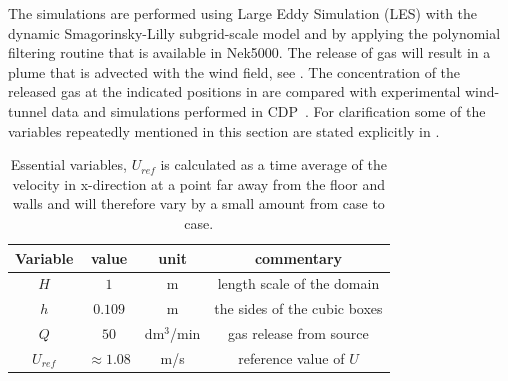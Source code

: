 The simulations are performed using Large Eddy Simulation (LES) 
with the dynamic Smagorinsky-Lilly subgrid-scale model and by applying the polynomial filtering
routine that is available in Nek5000. 
The release of gas will result in a plume that is advected with the wind field,
see . The concentration of the released gas at the 
indicated positions in  are compared with 
experimental wind-tunnel data and simulations performed in CDP~\cite{CDP}. 
For clarification some of the variables repeatedly mentioned in this section are
stated explicitly in .
\begin{table}[h]
    \centering
    \begin{tabular}{c c c c}
        Variable & value & unit & commentary \\ \hline
        $H$   & $1$ & m & length scale of the domain \\ 
        $h$   & $0.109$ & m & the sides of the cubic boxes\\ 
        $Q$   & $50$ & dm$^3$/min & gas release from source \\ 
        $U_{ref} $& $\approx1.08$ & m/s & reference value of $U$ \\
    \end{tabular}
    \caption{Essential variables, $U_{ref}$ is calculated as a time average of the velocity in 
        x-direction at a point far away from the floor and walls and will therefore 
        vary by a small amount from case to case. }
    \label{tab:simplevariables}
\end{table}

